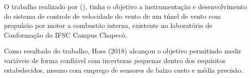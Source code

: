 O trabalho realizado por \citeauthor{hoss2018implantaccao} (\citeyear{hoss2018implantaccao}), tinha o objetivo a instrumentação e desenvolvimento do sistema de controle de 
velocidade do vento de um túnel de vento com propulsão por motor a combustão interna, existente no laboratório de 
Conformação do IFSC Campus Chapecó.

Como resultado do trabalho, Hoss (2018) alcançou o objetivo permitindo medir variáveis de forma confiável com 
incertezas pequenas dentro dos requisitos estabelecidos, mesmo com emprego de sensores de baixo custo e média precisão.
